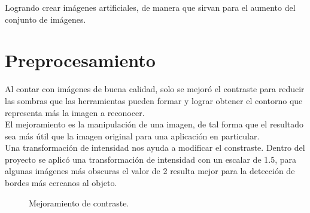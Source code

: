 \documentclass[a4paper, 11pt]{article}
\begin{document}
Logrando crear imágenes artificiales, de manera que sirvan para el aumento del conjunto de imágenes.\\

\pagebreak
\section{Preprocesamiento}

Al contar con imágenes de buena calidad, solo se mejoró el contraste para reducir las sombras que las herramientas pueden formar y lograr obtener el contorno que representa más la imagen a reconocer.\\

El mejoramiento es la manipulación de una imagen, de tal forma que el resultado sea más útil que la imagen original para una aplicación en particular.\\

Una transformación de intensidad nos ayuda a modificar el constraste. Dentro del proyecto se aplicó una transformación de intensidad con un escalar de 1.5, para algunas imágenes más obscuras el valor de 2 resulta mejor para la detección de bordes más cercanos al objeto.\\

\begin{figure}[ht]%
    \centering
    \qquad
    \caption{Mejoramiento de contraste.}%
    \label{fig:grayImage}%
\end{figure}
\end{document}
